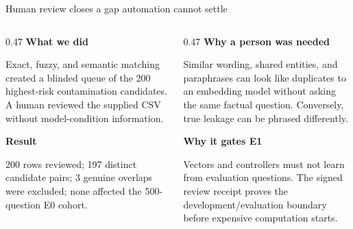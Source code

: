 \documentclass[aspectratio=169,11pt]{beamer}
\begin{document}
\begin{frame}{Human review closes a gap automation cannot settle}
  \small
  \begin{columns}[T,onlytextwidth]
    \begin{column}{0.47\textwidth}
      \textbf{What we did}\par\vspace{0.15cm}
      Exact, fuzzy, and semantic matching created a blinded queue of the 200 highest-risk contamination candidates. A human reviewed the supplied CSV without model-condition information.\par\vspace{0.35cm}
      \textbf{Result}\par
      200 rows reviewed; 197 distinct candidate pairs; 3 genuine overlaps were excluded; none affected the 500-question E0 cohort.
    \end{column}
    \begin{column}{0.47\textwidth}
      \textbf{Why a person was needed}\par\vspace{0.15cm}
      Similar wording, shared entities, and paraphrases can look like duplicates to an embedding model without asking the same factual question. Conversely, true leakage can be phrased differently.\par\vspace{0.35cm}
      \textbf{Why it gates E1}\par
      Vectors and controllers must not learn from evaluation questions. The signed review receipt proves the development/evaluation boundary before expensive computation starts.
    \end{column}
  \end{columns}
\end{frame}
\end{document}
